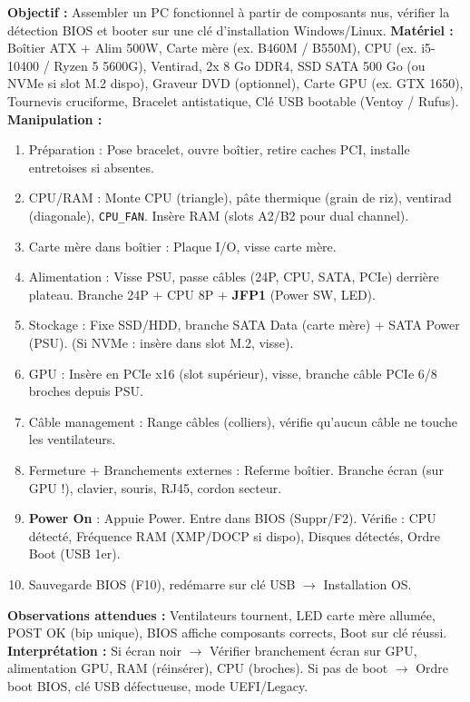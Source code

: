 \documentclass[11pt]{article}
\begin{document}
\begin{experience}
\textbf{Objectif :} Assembler un PC fonctionnel à partir de composants nus, vérifier la détection BIOS et booter sur une clé d'installation Windows/Linux.
\textbf{Matériel :} Boîtier ATX + Alim 500W, Carte mère (ex. B460M / B550M), CPU (ex. i5-10400 / Ryzen 5 5600G), Ventirad, 2x 8 Go DDR4, SSD SATA 500 Go (ou NVMe si slot M.2 dispo), Graveur DVD (optionnel), Carte GPU (ex. GTX 1650), Tournevis cruciforme, Bracelet antistatique, Clé USB bootable (Ventoy / Rufus).
\textbf{Manipulation :}
\begin{enumerate}
\item Préparation : Pose bracelet, ouvre boîtier, retire caches PCI, installe entretoises si absentes.
\item CPU/RAM : Monte CPU (triangle), pâte thermique (grain de riz), ventirad (diagonale), \texttt{CPU\_FAN}. Insère RAM (slots A2/B2 pour dual channel).
\item Carte mère dans boîtier : Plaque I/O, visse carte mère.
\item Alimentation : Visse PSU, passe câbles (24P, CPU, SATA, PCIe) derrière plateau. Branche 24P + CPU 8P + \textbf{JFP1} (Power SW, LED).
\item Stockage : Fixe SSD/HDD, branche SATA Data (carte mère) + SATA Power (PSU). (Si NVMe : insère dans slot M.2, visse).
\item GPU : Insère en PCIe x16 (slot supérieur), visse, branche câble PCIe 6/8 broches depuis PSU.
\item Câble management : Range câbles (colliers), vérifie qu'aucun câble ne touche les ventilateurs.
\item Fermeture + Branchements externes : Referme boîtier. Branche écran (sur GPU !), clavier, souris, RJ45, cordon secteur.
\item \textbf{Power On} : Appuie Power. Entre dans BIOS (Suppr/F2). Vérifie : CPU détecté, Fréquence RAM (XMP/DOCP si dispo), Disques détectés, Ordre Boot (USB 1er).
\item Sauvegarde BIOS (F10), redémarre sur clé USB $\rightarrow$ Installation OS.
\end{enumerate}
\textbf{Observations attendues :} Ventilateurs tournent, LED carte mère allumée, POST OK (bip unique), BIOS affiche composants corrects, Boot sur clé réussi.
\textbf{Interprétation :} Si écran noir $\rightarrow$ Vérifier branchement écran sur GPU, alimentation GPU, RAM (réinsérer), CPU (broches). Si pas de boot $\rightarrow$ Ordre boot BIOS, clé USB défectueuse, mode UEFI/Legacy.
\end{experience}
\end{document}
